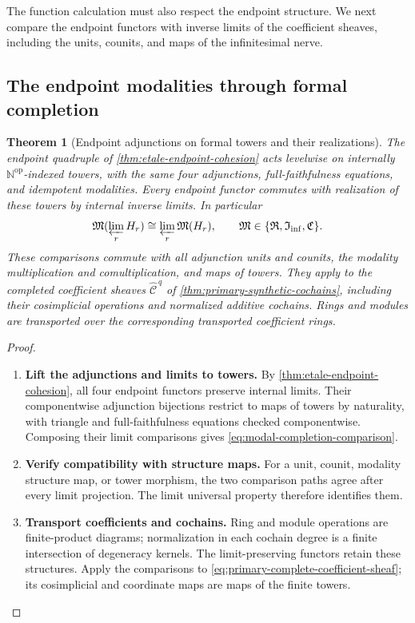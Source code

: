 \documentclass[11pt,a4paper]{article}
\numberwithin{algorithm}{section}
\numberwithin{equation}{section}
\newtheorem{theorem}{Theorem}[section]
\theoremstyle{definition}
\theoremstyle{remark}
\theoremstyle{plain}
\newcommand{\N}{\mathbb N}
\newcommand{\InfShape}{\mathfrak I_{\mathrm{inf}}}
\theoremstyle{definition}
\theoremstyle{plain}
\begin{document}
The function calculation must also respect the endpoint structure.
We next compare the endpoint functors with inverse limits of the
coefficient sheaves, including the units, counits, and maps of the
infinitesimal nerve.

\subsection{The endpoint modalities through formal completion}
\label{sec:modal-formal-completion}
\begin{theorem}[Endpoint adjunctions on formal towers and their realizations]
\label{thm:modal-formal-completion}
The endpoint quadruple of \cref{thm:etale-endpoint-cohesion}
acts levelwise on internally $\N^{\mathrm{op}}$-indexed towers,
with the same four adjunctions, full-faithfulness equations, and
idempotent modalities.  Every endpoint functor commutes with
realization of these towers by internal inverse limits.  In particular
\begin{equation}\label{eq:modal-completion-comparison}
 \mathfrak M(\varprojlim_rH_r)
 \cong\varprojlim_r\mathfrak M(H_r),
 \qquad
 \mathfrak M\in\{\mathfrak R,\InfShape,\mathfrak C\}.
\end{equation}
These comparisons commute with all adjunction units and counits,
the modality multiplication and comultiplication, and maps of towers.
They apply to the completed coefficient sheaves
$\widehat{\mathcal C}^{\,q}$ of
\cref{thm:primary-synthetic-cochains}, including their cosimplicial
operations and normalized additive cochains.  Rings and modules
are transported over the corresponding transported coefficient rings.
\end{theorem}
\begin{proof}\leavevmode
\begin{enumerate}[leftmargin=*,align=left]
\item \textbf{Lift the adjunctions and limits to towers.}
By \cref{thm:etale-endpoint-cohesion}, all four endpoint functors
preserve internal limits. Their componentwise adjunction bijections
restrict to maps of towers by naturality, with triangle and
full-faithfulness equations checked componentwise.
Composing their limit comparisons gives
\eqref{eq:modal-completion-comparison}.

\item \textbf{Verify compatibility with structure maps.}
For a unit, counit, modality structure map, or tower morphism,
the two comparison paths agree after every limit projection.
The limit universal property therefore identifies them.

\item \textbf{Transport coefficients and cochains.}
Ring and module operations are finite-product diagrams; normalization
in each cochain degree is a finite intersection of degeneracy kernels.
The limit-preserving functors retain these structures.
Apply the comparisons to \eqref{eq:primary-complete-coefficient-sheaf};
its cosimplicial and coordinate maps are maps of the finite towers.
\end{enumerate}
\end{proof}
\end{document}
